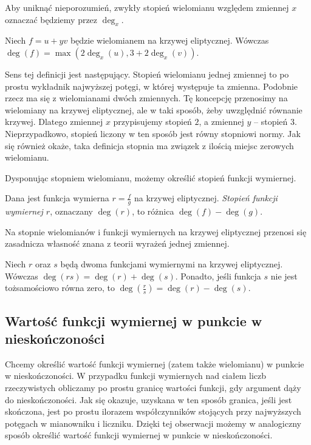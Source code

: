 \begin{remark}
Aby uniknąć nieporozumień,
zwykły stopień wielomianu względem zmiennej $x$
oznaczać będziemy przez $\deg_x$.
\end{remark}

\begin{fact}
Niech $f = u + yv$ będzie wielomianem na krzywej eliptycznej.
Wówczas $\deg(f) = \max(2\deg_x(u), 3 + 2\deg_x(v))$.
\end{fact}

Sens tej definicji jest następujący. Stopień wielomianu jednej zmiennej
to po prostu wykładnik najwyższej potęgi, w której występuje ta zmienna.
Podobnie rzecz ma się z wielomianami dwóch zmiennych.
Tę koncepcję przenosimy na wielomiany na krzywej eliptycznej,
ale w taki sposób, żeby uwzględnić równanie krzywej.
Dlatego zmiennej $x$ przypisujemy stopień $2$,
a zmiennej $y$ -- stopień $3$.
Nieprzypadkowo, stopień liczony w ten sposób
jest równy stopniowi normy.
Jak się również okaże,
taka definicja stopnia ma związek z ilością miejsc zerowych wielomianu.

Dysponując stopniem wielomianu, możemy określić stopień funkcji wymiernej.

\begin{definition}
Dana jest funkcja wymierna $r = \frac{f}{g}$ na krzywej eliptycznej.
\emph{Stopień funkcji wymiernej $r$},
oznaczany $\deg(r)$,
to różnica $\deg(f) - \deg(g)$.
\end{definition}

Na stopnie wielomianów i funkcji wymiernych na krzywej eliptycznej
przenosi się zasadnicza własność znana z teorii wyrażeń jednej zmiennej.

\begin{theorem}
Niech $r$ oraz $s$ będą dwoma funkcjami wymiernymi na krzywej eliptycznej.
Wówczas $\deg(rs) = \deg(r) + \deg(s)$.
Ponadto, jeśli funkcja $s$ nie jest tożsamościowo równa zero,
to $\deg(\frac{r}{s}) = \deg(r) - \deg(s)$.
\end{theorem}

\subsection*{Wartość funkcji wymiernej w punkcie w nieskończoności}

Chcemy określić wartość funkcji wymiernej (zatem także wielomianu)
w punkcie w nieskończoności.
W przypadku funkcji wymiernych nad ciałem liczb rzeczywistych
obliczamy po prostu granicę wartości funkcji,
gdy argument dąży do nieskończoności.
Jak się okazuje, uzyskana w ten sposób granica, jeśli jest skończona,
jest po prostu ilorazem współczynników stojących przy najwyższych potęgach
w mianowniku i liczniku.
Dzięki tej obserwacji możemy w analogiczny sposób określić
wartość funkcji wymiernej w punkcie w nieskończoności.

